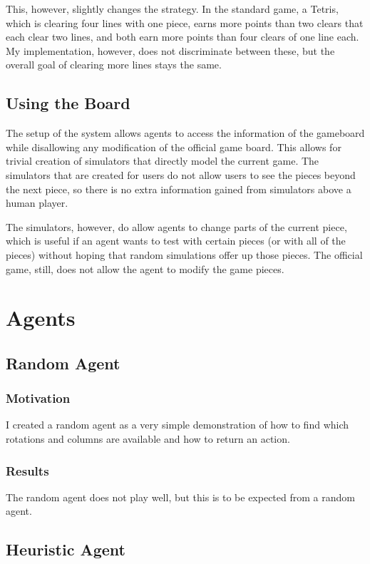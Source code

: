 \documentclass{article}
\begin{document}
This, however, slightly changes the strategy. In the standard game, a Tetris, which is clearing four lines with one piece, earns more points than two clears that each clear two lines, and both earn more points than four clears of one line each. My implementation, however, does not discriminate between these, but the overall goal of clearing more lines stays the same.

\subsection{Using the Board}
The setup of the system allows agents to access the information of the gameboard while disallowing any modification of the official game board. This allows for trivial creation of simulators that directly model the current game. The simulators that are created for users do not allow users to see the pieces beyond the next piece, so there is no extra information gained from simulators above a human player.

The simulators, however, do allow agents to change parts of the current piece, which is useful if an agent wants to test with certain pieces (or with all of the pieces) without hoping that random simulations offer up those pieces. The official game, still, does not allow the agent to modify the game pieces.


\section{Agents}

\subsection{Random Agent}
\subsubsection{Motivation}
I created a random agent as a very simple demonstration of how to find which rotations and columns are available and how to return an action.
\subsubsection{Results}
The random agent does not play well, but this is to be expected from a random agent.

\subsection{Heuristic Agent}
\end{document}
